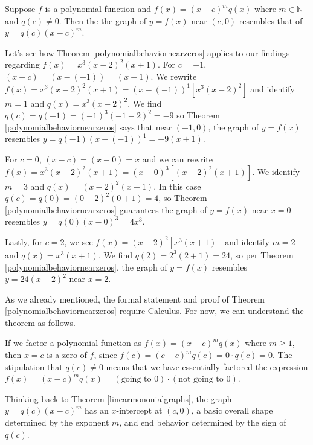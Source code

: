 \documentclass{ximera}
\begin{document}
\begin{theorem}  \label{polynomialbehaviornearzeros}  Suppose $f$ is a polynomial function and $f(x) = (x-c)^m q(x)$ where $m \in \mathbb{N}$ and $q(c) \neq 0$.  Then the the graph of $y = f(x)$ near $(c,0)$ resembles that of $y = q(c) (x-c)^m$.


\end{theorem}



Let's see how Theorem \ref{polynomialbehaviornearzeros}  applies to our findings regarding $f(x) =  x^3 (x-2)^2 (x+1)$. For $c = -1$, $(x-c) = (x-(-1)) = (x+1)$.  We  rewrite $f(x) =  x^3 (x-2)^2 (x+1) = (x-(-1))^1 \left[x^3(x-2)^2\right]$ and identify $m=1$ and $q(x) = x^3 (x-2)^2$.   We find $q(c) = q(-1) = (-1)^3(-1-2)^2 = -9$ so  Theorem \ref{polynomialbehaviornearzeros} says that near $(-1,0)$, the graph of $y=f(x)$ resembles $y = q(-1)(x-(-1))^1 = -9(x+1)$.  


For $c=0$, $(x-c) = (x-0) = x$ and we can rewrite $f(x) =  x^3 (x-2)^2 (x+1) = (x-0)^3 \left[(x-2)^2 (x+1)\right]$.  We identify $m=3$ and $q(x) = (x-2)^2(x+1)$.  In this case $q(c) = q(0) = (0-2)^2(0+1) = 4$, so  Theorem \ref{polynomialbehaviornearzeros} guarantees the graph  of $y = f(x)$ near $x=0$ resembles  $y = q(0)(x-0)^3 = 4x^3$.  


Lastly, for $c = 2$, we see $f(x) = (x-2)^2 \left[x^3 (x+1)\right]$ and  identify $m = 2$ and $q(x) = x^3(x+1)$.  We find $q(2) = 2^3 (2+1)= 24$, so  per Theorem \ref{polynomialbehaviornearzeros}, the graph of $y = f(x)$ resembles $y = 24(x-2)^2$ near $x=2$.


As we already mentioned,  the formal statement and proof of Theorem \ref{polynomialbehaviornearzeros} require Calculus.  For now, we can understand the theorem as follows.   


If we factor a polynomial function as $f(x) = (x-c)^m q(x)$ where $m \geq 1$,   then $x=c$ is a zero of $f$, since $f(c) = (c-c)^m q(c) = 0 \cdot q(c) = 0$.  The stipulation that $q(c) \neq 0$ means that we have essentially factored the expression $f(x) = (x-c)^m q(x) = (\text{going to $0$}) \cdot (\text{not going to $0$})$.


Thinking back to Theorem \ref{linearmononialgraphs}, the graph $y = q(c) (x-c)^m$ has an $x$-intercept at $(c,0)$, a basic overall shape determined by the exponent $m$, and end behavior determined by the sign of $q(c)$.   
\end{document}
